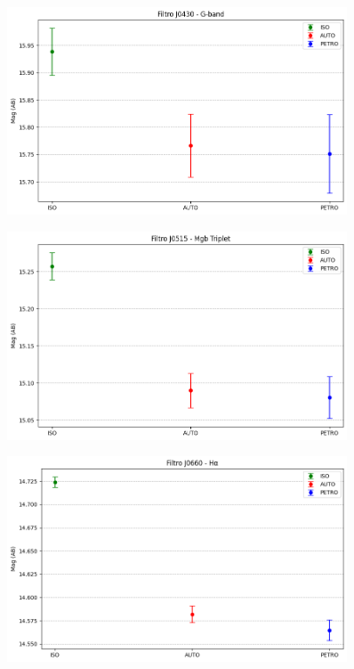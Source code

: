 \begin{anexosenv}
    \begin{figure}[h]
        \centering
        \includegraphics[width=0.9\textwidth]{Imagens/incerteza_abertura_J0430.png} 
        \caption[]{}
        \label{fig:incerteza_abertura_J0430} 
    \end{figure}

    \begin{figure}[h]
        \centering
        \includegraphics[width=0.9\textwidth]{Imagens/incerteza_abertura_J0515.png} 
        \caption[]{}
        \label{fig:incerteza_abertura_J0515} 
    \end{figure}

    \begin{figure}[h]
        \centering
        \includegraphics[width=0.9\textwidth]{Imagens/incerteza_abertura_J0660.png} 
        \caption[]{}
        \label{fig:incerteza_abertura_J0660} 
    \end{figure}


\end{anexosenv}

